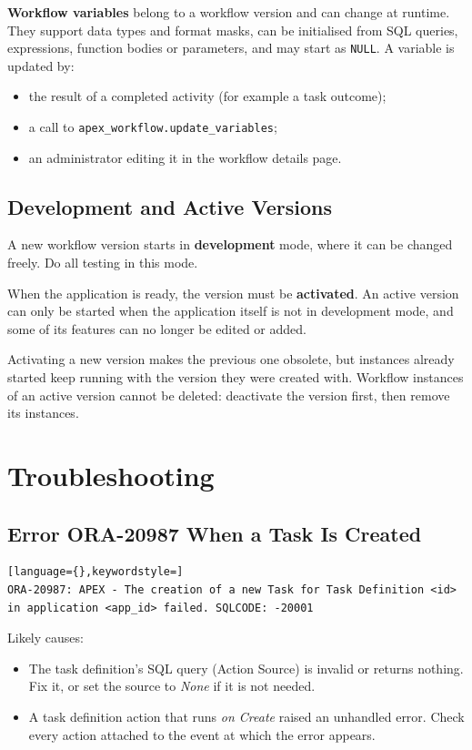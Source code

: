 \documentclass[11pt,a4paper]{article}
\begin{document}
\textbf{Workflow variables} belong to a workflow version and can change at runtime. They support data types and format masks, can be initialised from SQL queries, expressions, function bodies or parameters, and may start as \texttt{NULL}. A variable is updated by:
\begin{itemize}
\item the result of a completed activity (for example a task outcome);
\item a call to \texttt{apex\_workflow.update\_variables};
\item an administrator editing it in the workflow details page.
\end{itemize}

\subsection{Development and Active Versions}
A new workflow version starts in \textbf{development} mode, where it can be changed freely. Do all testing in this mode.

When the application is ready, the version must be \textbf{activated}. An active version can only be started when the application itself is not in development mode, and some of its features can no longer be edited or added.

Activating a new version makes the previous one obsolete, but instances already started keep running with the version they were created with. Workflow instances of an active version cannot be deleted: deactivate the version first, then remove its instances.

\section{Troubleshooting}
\subsection{Error ORA-20987 When a Task Is Created}
\begin{lstlisting}[language={},keywordstyle=]
ORA-20987: APEX - The creation of a new Task for Task Definition <id>
in application <app_id> failed. SQLCODE: -20001
\end{lstlisting}
Likely causes:
\begin{itemize}
\item The task definition's SQL query (Action Source) is invalid or returns nothing. Fix it, or set the source to \emph{None} if it is not needed.
\item A task definition action that runs \emph{on Create} raised an unhandled error. Check every action attached to the event at which the error appears.
\end{itemize}
\end{document}
